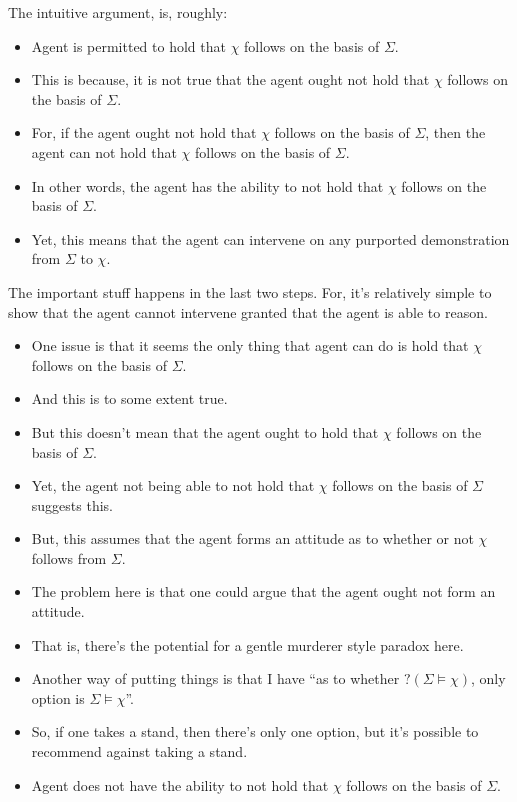 \documentclass[10pt]{article}
\begin{document}
The intuitive argument, is, roughly:

\begin{itemize}
\item Agent is permitted to hold that \(\chi\) follows on the basis of \(\Sigma\).
\item This is because, it is not true that the agent ought not hold that \(\chi\) follows on the basis of \(\Sigma\).
\item For, if the agent ought not hold that \(\chi\) follows on the basis of \(\Sigma\), then the agent can not hold that \(\chi\) follows on the basis of \(\Sigma\).
\item In other words, the agent has the ability to not hold that \(\chi\) follows on the basis of \(\Sigma\).
\item Yet, this means that the agent can intervene on any purported demonstration from \(\Sigma\) to \(\chi\).
\end{itemize}

The important stuff happens in the last two steps.
For, it's relatively simple to show that the agent cannot intervene granted that the agent is able to reason.

\begin{itemize}
\item One issue is that it seems the only thing that agent can do is hold that \(\chi\) follows on the basis of \(\Sigma\).
\item And this is to some extent true.
\item But this doesn't mean that the agent ought to hold that \(\chi\) follows on the basis of \(\Sigma\).
\item Yet, the agent not being able to not hold that \(\chi\) follows on the basis of \(\Sigma\) suggests this.
\item But, this assumes that the agent forms an attitude as to whether or not \(\chi\) follows from \(\Sigma\).
\item The problem here is that one could argue that the agent ought not form an attitude.
\item That is, there's the potential for a gentle murderer style paradox here.
\end{itemize}

\begin{itemize}
\item Another way of putting things is that I have ``as to whether \(?(\Sigma \vDash \chi)\), only option is \(\Sigma \vDash \chi\)''.
\item So, if one takes a stand, then there's only one option, but it's possible to recommend against taking a stand.
\item Agent does not have the ability to not hold that \(\chi\) follows on the basis of \(\Sigma\).
\end{itemize}
\end{document}
